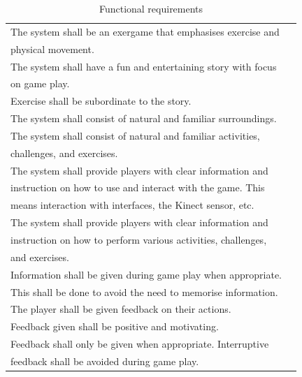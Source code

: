 \begin{table} [H]
\label{tab:func1}
\centering
    \begin{tabular}{|l|l|}
       \hline
       The system shall be an exergame that emphasises exercise and \\ physical movement.  \\ \hline
       The system shall have a fun and entertaining story with focus \\ on game play.  \\ \hline
       Exercise shall be subordinate to the story. \\ \hline
	   The system shall consist of natural and familiar surroundings. \\ \hline
	   The system shall consist of natural and familiar activities, \\ challenges, and exercises.\\ \hline
	   The system shall provide players with clear information and \\ instruction on how to use and interact with the game. This \\ means interaction with interfaces, the Kinect sensor, etc. \\ \hline
	   The system shall provide players with clear information and \\ instruction on how to perform various activities, challenges,\\ and exercises. \\ \hline
	   Information shall be given during game play when appropriate. \\ This shall be done to avoid the need to memorise information. \\ \hline
	   The player shall be given feedback on their actions.\\ \hline
	   Feedback given shall be positive and motivating.\\ \hline
	   Feedback shall only be given when appropriate. Interruptive \\ feedback shall be avoided during game play. \\ \hline
    \end{tabular}
    \caption[Functional requirements]{Functional requirements}
    \label{tab:agenda}
\end{table} 

